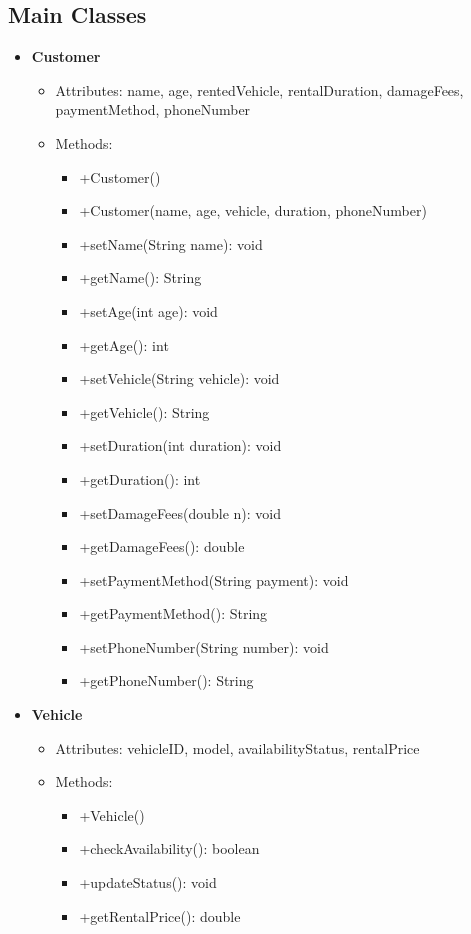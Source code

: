 \documentclass{article}
\begin{document}
\subsection{Main Classes}
\begin{itemize}
    \item \textbf{Customer}
        \begin{itemize}
            \item Attributes: name, age, rentedVehicle, rentalDuration, damageFees, paymentMethod, phoneNumber
            \item Methods: 
            \begin{itemize}
                \item +Customer()
                \item +Customer(name, age, vehicle, duration, phoneNumber)
                \item +setName(String name): void
                \item +getName(): String
                \item +setAge(int age): void
                \item +getAge(): int
                \item +setVehicle(String vehicle): void
                \item +getVehicle(): String
                \item +setDuration(int duration): void
                \item +getDuration(): int
                \item +setDamageFees(double n): void
                \item +getDamageFees(): double
                \item +setPaymentMethod(String payment): void
                \item +getPaymentMethod(): String
                \item +setPhoneNumber(String number): void
                \item +getPhoneNumber(): String
            \end{itemize}
        \end{itemize}
    
    \item \textbf{Vehicle}
        \begin{itemize}
            \item Attributes: vehicleID, model, availabilityStatus, rentalPrice
            \item Methods: 
            \begin{itemize}
                \item +Vehicle()
                \item +checkAvailability(): boolean
                \item +updateStatus(): void
                \item +getRentalPrice(): double
            \end{itemize}
        \end{itemize}
    

\end{itemize}
\end{document}
